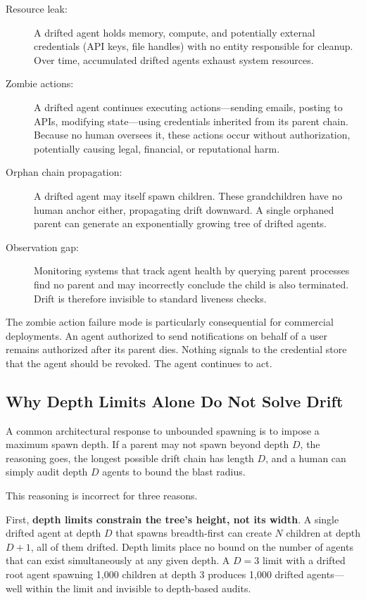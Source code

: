\begin{description}
\item[Resource leak:] A drifted agent holds memory, compute, and potentially
  external credentials (API keys, file handles) with no entity responsible for
  cleanup. Over time, accumulated drifted agents exhaust system resources.

\item[Zombie actions:] A drifted agent continues executing actions—sending
  emails, posting to APIs, modifying state—using credentials inherited from its
  parent chain. Because no human oversees it, these actions occur without
  authorization, potentially causing legal, financial, or reputational harm.

\item[Orphan chain propagation:] A drifted agent may itself spawn children. These
  grandchildren have no human anchor either, propagating drift downward. A single
  orphaned parent can generate an exponentially growing tree of drifted agents.

\item[Observation gap:] Monitoring systems that track agent health by querying
  parent processes find no parent and may incorrectly conclude the child is also
  terminated. Drift is therefore invisible to standard liveness checks.
\end{description}

The zombie action failure mode is particularly consequential for commercial
deployments. An agent authorized to send notifications on behalf of a user
remains authorized after its parent dies. Nothing signals to the credential
store that the agent should be revoked. The agent continues to act.

\subsection{Why Depth Limits Alone Do Not Solve Drift}

A common architectural response to unbounded spawning is to impose a maximum
spawn depth. If a parent may not spawn beyond depth $D$, the reasoning goes, the
longest possible drift chain has length $D$, and a human can simply audit depth
$D$ agents to bound the blast radius.

This reasoning is incorrect for three reasons.

First, \textbf{depth limits constrain the tree's height, not its width}. A single
drifted agent at depth $D$ that spawns breadth-first can create $N$ children at
depth $D+1$, all of them drifted. Depth limits place no bound on the number of
agents that can exist simultaneously at any given depth. A $D=3$ limit with a
drifted root agent spawning 1,000 children at depth 3 produces 1,000 drifted
agents—well within the limit and invisible to depth-based audits.

